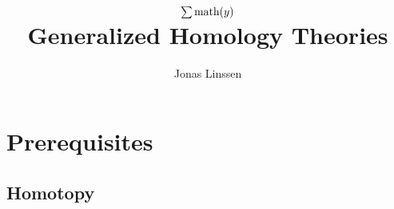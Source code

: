 

\title{$\sum\text{math}(y)$\\Generalized Homology Theories}
\author{Jonas Linssen}


	\maketitle
	\tableofcontents

	\newpage
	\setcounter{section}{-1}
	\section{Prerequisites}
	\subsection{Homotopy}

